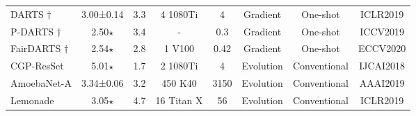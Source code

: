 \documentclass[sigconf]{acmart}
\begin{document}
\begin{table*}[!th]
\begin{tabular}{l|c|c|c|c|c|c|c}
DARTS \cite{Ref:10}$\dagger$                         & 3.00±0.14                                                                                & 3.3                                                           & 4 1080Ti                         & 4                                                                       & Gradient                                   & One-shot        &ICLR2019                               \\
P-DARTS \cite{Ref:52}$\dagger$                                       & 2.50$\star$                                                                                        & 3.4                                                           & -                                & 0.3                                                                       & Gradient                                  & One-shot  &ICCV2019                                     \\
FairDARTS \cite{Ref:35}$\dagger$                                       & 2.54$\star$                                                                                        & 2.8                                                           & 1 V100                                & 0.42                                                                       & Gradient                                  & One-shot   &ECCV2020                                    \\
CGP-ResSet \cite{Ref:59}                               & 5.01$\star$                                                                                    & 1.7                                                           & 2 1080Ti                          & 4                                                                      & Evolution                                  & Conventional         &IJCAI2018                          \\
AmoebaNet-A \cite{Ref:08}                               & 3.34±0.06                                                                                  & 3.2                                                           & 450 K40                          & 3150                                                                      & Evolution                                  & Conventional         &AAAI2019                          \\
Lemonade \cite{Ref:60}                               & 3.05$\star$                                                                                   & 4.7                                                           & 16 Titan X                          & 56                                                                      & Evolution                                  & Conventional         &ICLR2019                          \\

\end{tabular}
\end{table*}
\end{document}
